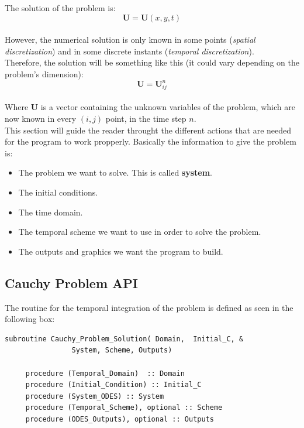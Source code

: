 The solution of the problem is: 
$$ \mathbf U = \mathbf U(x, y, t) $$\\

However, the numerical solution is only known in some points (\textit{spatial discretization}) and in
some discrete instants (\textit{temporal discretization}).\\

Therefore, the solution will be something like this (it could vary depending on the problem's dimension):
$$ \mathbf U = \mathbf U_{ij}^n $$\\

Where $\mathbf{U}$ is a vector containing the unknown variables of the problem, which are now known
in every $(i,j)$ point, in the time step $n$. \\

This section will guide the reader throught the different actions that are
needed for the program to work propperly. Basically the information to give
the problem is: \\
\begin{itemize}
  \item The problem we want to solve. This is called {\bf{system}}.
  \item The initial conditions. 
  \item The time domain.
  \item The temporal scheme we want to use in order to solve the problem.
  \item The outputs and graphics we want the program to build. 
\end{itemize}

\newpage


\subsection{Cauchy Problem API}

The routine for the temporal integration of the problem is defined as seen in
the following box: \\

\begin{blueframed}
\begin{lstlisting}
subroutine Cauchy_Problem_Solution( Domain,  Initial_C, &
				System, Scheme, Outputs)
        
     procedure (Temporal_Domain)  :: Domain 
     procedure (Initial_Condition) :: Initial_C
     procedure (System_ODES) :: System
     procedure (Temporal_Scheme), optional :: Scheme
     procedure (ODES_Outputs), optional :: Outputs 
     
     
\end{lstlisting}
\end{blueframed}

